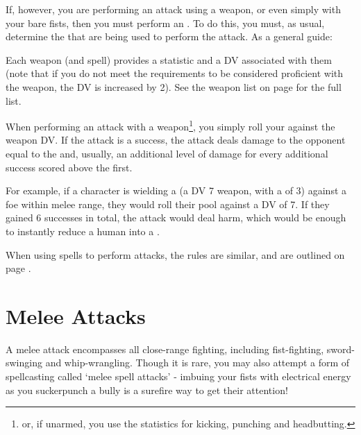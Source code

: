 If, however, you are performing an attack using a weapon, or even simply with your bare fists, then you must perform an . To do this, you must, as usual, determine the  that are being used to perform the attack. As a general guide:
\begin{itemize}
\end{itemize} 

Each weapon (and spell) provides a  statistic and a DV associated with them (note that if you do not meet the requirements to be considered proficient with the weapon, the DV is increased by 2). See the weapon list on page \pageref{S:Weapons} for the full list. 

When performing an attack with a weapon\footnote{or, if unarmed, you use the  statistics for kicking, punching and headbutting.}, you simply roll your  against the weapon DV. If the attack is a success, the attack deals damage to the opponent equal to the  and, usually, an additional level of damage for every additional success scored above the first. 

For example, if a character is wielding a  (a DV 7 weapon, with a  of 3) against a foe within melee range, they would roll their  pool against a DV of 7. If they gained 6 successes in total, the attack would deal  harm, which would be enough to instantly reduce a human into a . 

When using spells to perform attacks, the rules are similar, and are outlined on page \pageref{S:CastingSpells}.

\section{Melee Attacks}

A melee attack encompasses all close-range fighting, including fist-fighting, sword-swinging and whip-wrangling. Though it is rare, you may also attempt a form of spellcasting called `melee spell attacks' - imbuing your fists with electrical energy as you suckerpunch a bully is a surefire way to get their attention!

